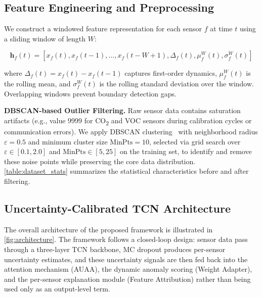 \subsection{Feature Engineering and Preprocessing}

We construct a windowed feature representation for each sensor $f$ at time $t$ using a sliding window of length $W$:

\begin{equation}
\mathbf{h}_f(t) = \left[x_f(t), x_f(t-1), \dots, x_f(t-W+1), \Delta_f(t), \mu_f^W(t), \sigma_f^W(t)\right]
\label{eq:feature_rep}
\end{equation}

where $\Delta_f(t) = x_f(t) - x_f(t-1)$ captures first-order dynamics, $\mu_f^W(t)$ is the rolling mean, and $\sigma_f^W(t)$ is the rolling standard deviation over the window. Overlapping windows prevent boundary detection gaps.

\textbf{DBSCAN-based Outlier Filtering.} Raw sensor data contains saturation artifacts (e.g., value 9999 for CO\textsubscript{2} and VOC sensors during calibration cycles or communication errors). We apply DBSCAN clustering~\cite{ester1996dbscan} with neighborhood radius $\varepsilon = 0.5$ and minimum cluster size $\text{MinPts} = 10$, selected via grid search over $\varepsilon \in [0.1, 2.0]$ and $\text{MinPts} \in [5, 25]$ on the training set, to identify and remove these noise points while preserving the core data distribution. \cref{table:dataset_stats} summarizes the statistical characteristics before and after filtering.



\subsection{Uncertainty-Calibrated TCN Architecture}

The overall architecture of the proposed framework is illustrated in \cref{fig:architecture}. The framework follows a closed-loop design: sensor data pass through a three-layer TCN backbone, MC dropout produces per-sensor uncertainty estimates, and these uncertainty signals are then fed back into the attention mechanism (AUAA), the dynamic anomaly scoring (Weight Adapter), and the per-sensor explanation module (Feature Attribution) rather than being used only as an output-level term.




